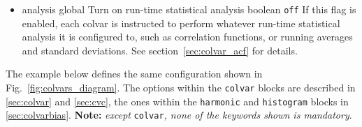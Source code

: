 \begin{itemize}
\item %
  \keydef
    {analysis}{%
    global}{%
    Turn on run-time statistical analysis}{%
    boolean}{%
    \texttt{off}}{%
    If this flag is enabled, each colvar is instructed to perform
    whatever run-time statistical analysis it is configured to, such as
    correlation functions, or running averages and standard deviations.
    See section~\ref{sec:colvar_acf} for details.}
    
\end{itemize}

The example below defines the same configuration shown in Fig.~\ref{fig:colvars_diagram}.  The options within the \texttt{colvar} blocks are described in \ref{sec:colvar} and \ref{sec:cvc}, the ones within the \texttt{harmonic} and \texttt{histogram} blocks in \ref{sec:colvarbias}.
\textbf{Note:} \emph{except }\texttt{colvar}\emph{, none of the keywords shown is mandatory}.\\

